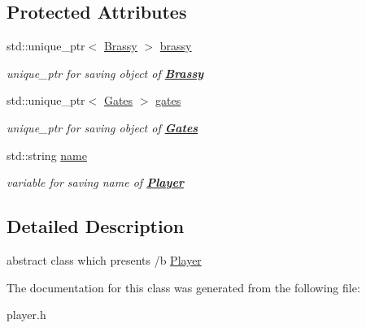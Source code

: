 \subsection*{Protected Attributes}
\begin{DoxyCompactItemize}
\item 
\mbox{\label{class_player_ae51f69d54b2956ecafd80adf0d2bb320}} 
std\+::unique\+\_\+ptr$<$ \mbox{\hyperlink{class_brassy}{Brassy}} $>$ \mbox{\hyperlink{class_player_ae51f69d54b2956ecafd80adf0d2bb320}{brassy}}
\begin{DoxyCompactList}\small\item\em {\itshape unique\+\_\+ptr} for saving object of {\bfseries{\mbox{\hyperlink{class_brassy}{Brassy}}}} \end{DoxyCompactList}\item 
\mbox{\label{class_player_acc7a48d77ae1aaaa2ee801082c4ccd0a}} 
std\+::unique\+\_\+ptr$<$ \mbox{\hyperlink{class_gates}{Gates}} $>$ \mbox{\hyperlink{class_player_acc7a48d77ae1aaaa2ee801082c4ccd0a}{gates}}
\begin{DoxyCompactList}\small\item\em {\itshape unique\+\_\+ptr} for saving object of {\bfseries{\mbox{\hyperlink{class_gates}{Gates}}}} \end{DoxyCompactList}\item 
\mbox{\label{class_player_af9c920fabaafdeb7961a645315b521ff}} 
std\+::string \mbox{\hyperlink{class_player_af9c920fabaafdeb7961a645315b521ff}{name}}
\begin{DoxyCompactList}\small\item\em {\itshape variable} for saving {\itshape name} of {\bfseries{\mbox{\hyperlink{class_player}{Player}}}} \end{DoxyCompactList}\end{DoxyCompactItemize}


\subsection{Detailed Description}
abstract class which presents /b \mbox{\hyperlink{class_player}{Player}} 

The documentation for this class was generated from the following file\+:\begin{DoxyCompactItemize}
\item 
player.\+h\end{DoxyCompactItemize}
